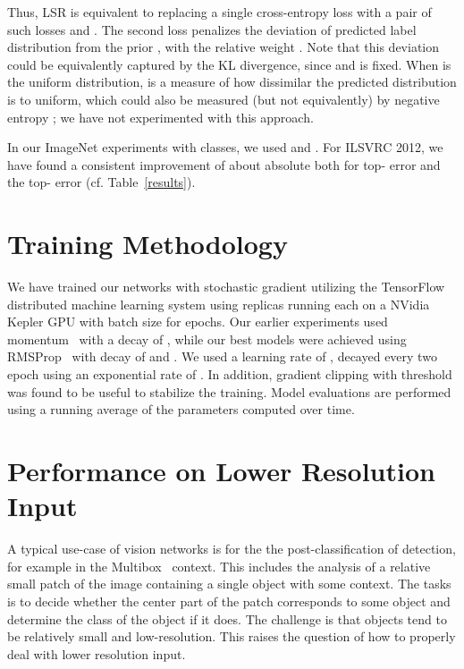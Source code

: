 \documentclass[10pt,twocolumn,letterpaper]{article}
\begin{document}
Thus, LSR is equivalent to replacing a single cross-entropy loss  with a
pair of such losses  and . The second loss penalizes the
deviation of predicted label distribution  from the prior , with the 
relative weight . Note that this deviation could be
equivalently captured by the KL divergence, since 
and  is fixed. When  is the uniform distribution,  is a measure
of how dissimilar the predicted distribution  is to uniform, which could also be
measured (but not equivalently) by negative entropy ; we have not
experimented with this approach.

In our ImageNet experiments with  classes, we used  and
. For ILSVRC 2012, we have found a consistent improvement of
about  absolute both for top- error and the top- error
(cf. Table~\ref{results}).
 \section{Training Methodology}
We have trained our networks with stochastic gradient utilizing the
TensorFlow~\cite{tensorflow2015-whitepaper} distributed machine learning system
using  replicas running each on a NVidia Kepler GPU with batch size 
for  epochs.
Our earlier experiments used momentum~\cite{icml2013_sutskever13} with a
decay of , while our best models were achieved using RMSProp~\cite{rmsprop}
with decay of  and . We used a learning rate of ,
decayed every two epoch using an exponential rate of .
In addition, gradient clipping \cite{pascanu2012difficulty} with threshold 
was found to be useful to stabilize the training. Model evaluations are
performed using a running average of the parameters computed over time.
 \section{Performance on Lower Resolution Input}

A typical use-case of vision networks is for the the post-classification of
detection, for example in the Multibox~\cite{erhan2014scalable} context.
This includes
the analysis of a relative small patch of the image containing a single
object with some context. The tasks is to decide whether the center part
of the patch corresponds to some object and determine the class of the
object if it does. The challenge is that objects tend to be relatively
small and low-resolution. This raises the question of how to properly
deal with lower resolution input.
\end{document}

